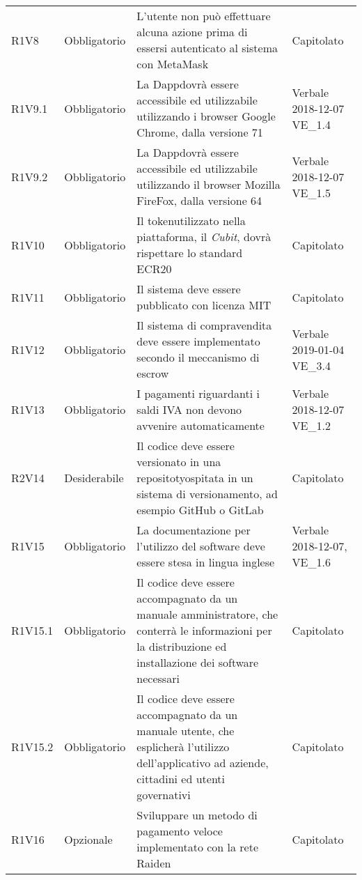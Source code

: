 \begin{longtable}{ >{\centering}p{} >{\centering}p{}
			>{\raggedright}p{} >{\centering}p{}}
R1V8	&	Obbligatorio	&	L'utente non può effettuare alcuna azione prima di essersi autenticato al sistema con MetaMask\glo	&	Capitolato	\tabularnewline
R1V9.1	&	Obbligatorio	&	La Dapp\glosp dovrà essere accessibile ed utilizzabile utilizzando i browser Google Chrome, dalla versione 71	&	Verbale 2018-12-07  VE\_1.4	\tabularnewline
R1V9.2	&	Obbligatorio	&	La Dapp\glosp dovrà essere accessibile ed utilizzabile utilizzando il browser Mozilla FireFox, dalla versione 64	&	Verbale 2018-12-07 VE\_1.5	\tabularnewline
R1V10	&	Obbligatorio	&	Il token\glosp utilizzato nella piattaforma, il \textit{Cubit}\glo, dovrà rispettare lo standard ECR20\glo	&	Capitolato	\tabularnewline
R1V11	&	Obbligatorio	&	Il sistema deve essere pubblicato con licenza MIT	&	Capitolato	\tabularnewline
R1V12	&	Obbligatorio	&	Il sistema di compravendita deve essere implementato secondo il meccanismo di escrow\glo	&	Verbale 2019-01-04  VE\_3.4	\tabularnewline
R1V13	&	Obbligatorio	&	I pagamenti riguardanti i saldi IVA non devono avvenire automaticamente	&	Verbale 2018-12-07 VE\_1.2	\tabularnewline
R2V14	&	Desiderabile	&	Il codice deve essere versionato in una repositoty\glosp ospitata in un sistema di versionamento, ad esempio GitHub o GitLab	&	Capitolato	\tabularnewline
R1V15	&	Obbligatorio	&	La documentazione per l'utilizzo del software deve essere stesa in lingua inglese	&	Verbale 2018-12-07, VE\_1.6	\tabularnewline
R1V15.1	&	Obbligatorio	&	Il codice deve essere accompagnato da un manuale amministratore, che conterrà le informazioni per la distribuzione ed installazione dei software necessari	&	Capitolato	\tabularnewline
R1V15.2	&	Obbligatorio	&	Il codice deve essere accompagnato da un manuale utente, che esplicherà l'utilizzo dell'applicativo ad aziende, cittadini ed utenti governativi	&	Capitolato	\tabularnewline
R1V16	&	Opzionale	&	Sviluppare un metodo di pagamento veloce implementato con la rete Raiden\glo	&	Capitolato	\tabularnewline
		
		
		
		
	\end{longtable}
